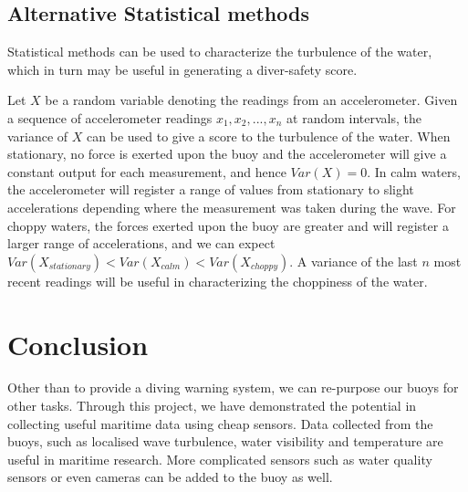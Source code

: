 \documentclass{article}
\begin{document}
\subsection{Alternative Statistical methods}

\begin{multicols}{2}
 Statistical methods can be used to characterize the turbulence of the water, which in turn may be useful in generating a diver-safety score.

 Let $X$ be a random variable denoting the readings from an accelerometer. Given a sequence of accelerometer readings $x_1, x_2, ..., x_n$ at random intervals, the variance of $X$ can be used to give a score to the turbulence of the water. When stationary, no force is exerted upon the buoy and the accelerometer will give a constant output for each measurement, and hence $Var(X) = 0$. In calm waters, the accelerometer will register a range of values from stationary to slight accelerations depending where the measurement was taken during the wave. For choppy waters, the forces exerted upon the buoy are greater and will register a larger range of accelerations, and we can expect $Var(X_{stationary}) < Var(X_{calm}) < Var(X_{choppy})$. A variance of the last $n$ most recent readings will be useful in characterizing the choppiness of the water.
\end{multicols}


\section{Conclusion}


    Other than to provide a diving warning system, we can re-purpose our buoys for other tasks. Through this project, we have demonstrated the potential in collecting useful maritime data using cheap sensors. Data collected from the buoys, such as localised wave turbulence, water visibility and temperature are useful in maritime research. More complicated sensors such as water quality sensors or even cameras can be added to the buoy as well. 


\end{document}
